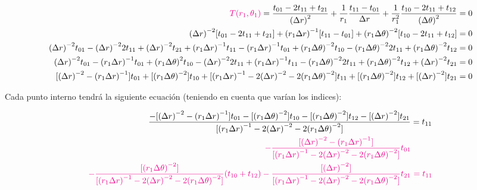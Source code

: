 \documentclass{article}
\begin{document}
\

\begin{align*}
    \textcolor{magenta}{T(r_1,\theta_1)} = 
    \frac{t_{01} - 2t_{11} + t_{21}}{{(\Delta r)}^{2}} + 
    \frac{1}{r_1}\frac{t_{11} - t_{01}}{\Delta r} + 
    \frac{1}{r_{1}^{2}}\frac{t_{10} - 2t_{11} + t_{12}}{{(\Delta\theta)}^2} &= 0 \\
    {(\Delta r)}^{-2}[t_{01} - 2t_{11} + t_{21}] + 
    {(r_1\Delta r)}^{-1}[t_{11} - t_{01}] + 
    {(r_{1}\Delta \theta)}^{-2}[t_{10} - 2t_{11} + t_{12}] &= 0 \\
    {(\Delta r)}^{-2}t_{01} - {(\Delta r)}^{-2}2t_{11} + {(\Delta r)}^{-2}t_{21} + 
    {(r_1\Delta r)}^{-1}t_{11} - {(r_1\Delta r)}^{-1}t_{01} + 
    {(r_{1}\Delta \theta)}^{-2}t_{10} - {(r_{1}\Delta \theta)}^{-2}2t_{11} + {(r_{1}\Delta \theta)}^{-2}t_{12} &= 0 \\
    {(\Delta r)}^{-2}t_{01} - {(r_1\Delta r)}^{-1}t_{01} + {(r_{1}\Delta \theta)}^{2}t_{10} 
    - {(\Delta r)}^{-2}2t_{11} + {(r_1\Delta r)}^{-1}t_{11} - {(r_{1}\Delta \theta)}^{-2}2t_{11} 
    + {(r_{1}\Delta \theta)}^{-2}t_{12} + {(\Delta r)}^{-2}t_{21} &= 0 \\
    [{(\Delta r)}^{-2} - {(r_1\Delta r)}^{-1}]t_{01} + [{(r_{1}\Delta \theta)}^{-2}]t_{10} 
    + [{(r_1\Delta r)}^{-1} - 2{(\Delta r)}^{-2} - 2{(r_{1}\Delta \theta)}^{-2}]t_{11} 
    + [{(r_{1}\Delta \theta)}^{-2}]t_{12} + [{(\Delta r)}^{-2}]t_{21} &= 0 \\
\end{align*}

\noindent Cada punto interno tendrá la siguiente ecuación (teniendo en cuenta que varían los indices):

\begin{align*}
    \frac{-[{(\Delta r)}^{-2} - {(r_1\Delta r)}^{-1}]t_{01} - [{(r_{1}\Delta \theta)}^{-2}]t_{10} 
    - [{(r_{1}\Delta \theta)}^{-2}]t_{12} - [{(\Delta r)}^{-2}]t_{21}}
    {[{(r_1\Delta r)}^{-1} - 2{(\Delta r)}^{-2} - 2{(r_{1}\Delta \theta)}^{-2}]} &= t_{11} \\
    \textcolor{magenta}{
    -\frac{[{(\Delta r)}^{-2} - {(r_1\Delta r)}^{-1}]}{[{(r_1\Delta r)}^{-1} - 2{(\Delta r)}^{-2} - 2{(r_{1}\Delta \theta)}^{-2}]}t_{01}}
    & \\
    \textcolor{magenta}{
    -\frac{[{(r_{1}\Delta \theta)}^{-2}]}{[{(r_1\Delta r)}^{-1} - 2{(\Delta r)}^{-2} - 2{(r_{1}\Delta \theta)}^{-2}]}(t_{10} + t_{12})
    -\frac{[{(\Delta r)}^{-2}]}{[{(r_1\Delta r)}^{-1} - 2{(\Delta r)}^{-2} - 2{(r_{1}\Delta \theta)}^{-2}]}t_{21}} &~\textcolor{magenta}{= t_{11}}
\end{align*}
\end{document}
